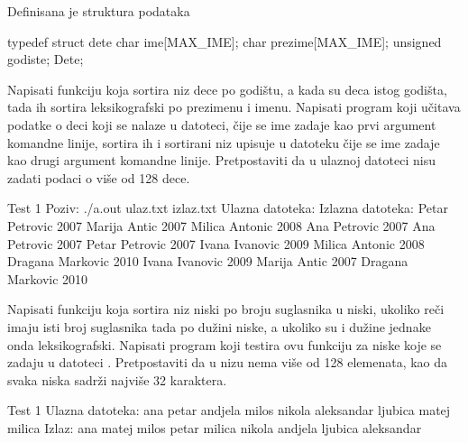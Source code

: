 \begin{Exercise}[label=508]
  Definisana je struktura podataka
\begin{ckod}
typedef struct dete
{
      char ime[MAX_IME];
      char prezime[MAX_IME];
      unsigned godiste;
} Dete;
\end{ckod}
Napisati funkciju koja sortira niz dece po godištu, a kada su deca
istog godišta, tada ih sortira leksikografski po prezimenu i
imenu. Napisati program koji učitava podatke o deci koji se nalaze u
datoteci, čije se ime zadaje kao prvi argument komandne linije,
sortira ih i sortirani niz upisuje u datoteku čije se ime zadaje kao
drugi argument komandne linije. Pretpostaviti da u ulaznoj datoteci
nisu zadati podaci o više od 128 dece.
  
\begin{maxitest}
\begin{test}{Test 1}
Poziv: ./a.out ulaz.txt izlaz.txt
Ulazna datoteka:                 Izlazna datoteka:
Petar Petrovic 2007              Marija Antic 2007
Milica Antonic 2008              Ana Petrovic 2007
Ana Petrovic 2007                Petar Petrovic 2007
Ivana Ivanovic 2009              Milica Antonic 2008
Dragana Markovic 2010            Ivana Ivanovic 2009
Marija Antic 2007                Dragana Markovic 2010
\end{test}
\end{maxitest}
  
\end{Exercise}

\begin{Exercise}[label=509]
  Napisati funkciju koja sortira niz niski po broju suglasnika u
  niski, ukoliko reči imaju isti broj suglasnika tada po dužini niske,
  a ukoliko su i dužine jednake onda leksikografski.  Napisati program
  koji testira ovu funkciju za niske koje se zadaju u datoteci
  .  Pretpostaviti da u nizu nema više od 128
  elemenata, kao da svaka niska sadrži najviše 32 karaktera.
  
\begin{maxitest}
\begin{test}{Test 1}
Ulazna datoteka:
ana petar andjela milos nikola aleksandar ljubica matej milica
Izlaz:
ana matej milos petar milica nikola andjela ljubica aleksandar
\end{test}
\end{maxitest}
  
\end{Exercise}

